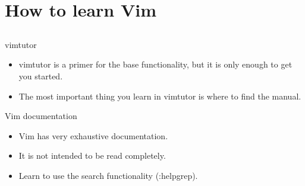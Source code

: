 \documentclass{beamer}
\begin{document}
    \section{How to learn Vim}
    \subsection{}
    \begin{frame}{vimtutor}
        \begin{itemize}
            \item <alert@+> vimtutor is a primer for the base functionality, but it is only enough to get you started.
            \item <alert@+> The most important thing you learn in vimtutor is where to find the manual.
        \end{itemize}
    \end{frame}
    \begin{frame}{Vim documentation}
        \begin{itemize}
            \item <alert@+> Vim has very exhaustive documentation.
            \item <alert@+> It is not intended to be read completely.  %
            \item <alert@+> Learn to use the search functionality (:helpgrep).
        \end{itemize}
    \end{frame}
\end{document}
